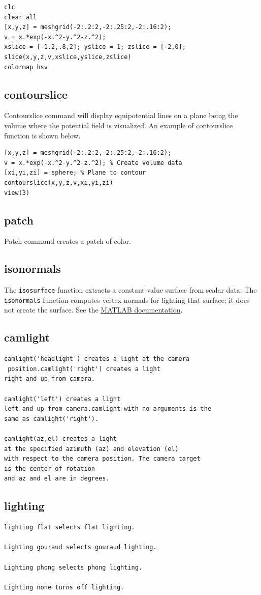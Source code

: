\documentclass{ximera}
\begin{document}
\begin{verbatim}
clc
clear all
[x,y,z] = meshgrid(-2:.2:2,-2:.25:2,-2:.16:2);
v = x.*exp(-x.^2-y.^2-z.^2);
xslice = [-1.2,.8,2]; yslice = 1; zslice = [-2,0];
slice(x,y,z,v,xslice,yslice,zslice)
colormap hsv
\end{verbatim}

\subsection{contourslice}

 Contourslice command will display equipotential lines on a plane being the volume where the potential field is visualized. An example of contourslice function is shown below.

\begin{verbatim}
[x,y,z] = meshgrid(-2:.2:2,-2:.25:2,-2:.16:2);
v = x.*exp(-x.^2-y.^2-z.^2); % Create volume data
[xi,yi,zi] = sphere; % Plane to contour
contourslice(x,y,z,v,xi,yi,zi)
view(3)
\end{verbatim}

\subsection{patch}

Patch command creates a patch of color.


\subsection{isonormals}

The \texttt{isosurface} function extracts a constant-value surface from scalar data. The \texttt{isonormals} function computes vertex normals for lighting that surface; it does not create the surface. See the \href{https://www.mathworks.com/help/matlab/ref/isonormals.html}{MATLAB documentation}.
\subsection{camlight}

\begin{verbatim}
camlight('headlight') creates a light at the camera
 position.camlight('right') creates a light
right and up from camera.

camlight('left') creates a light
left and up from camera.camlight with no arguments is the
same as camlight('right').

camlight(az,el) creates a light
at the specified azimuth (az) and elevation (el)
with respect to the camera position. The camera target 
is the center of rotation
and az and el are in degrees.

\end{verbatim}



\subsection{lighting}


\begin{verbatim}
lighting flat selects flat lighting.

Lighting gouraud selects gouraud lighting.

Lighting phong selects phong lighting.

Lighting none turns off lighting.
\end{verbatim}
\end{document}
